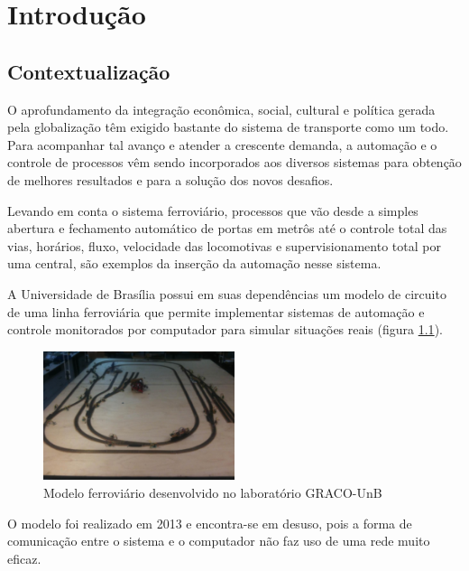 \chapter{Introdução}

\label{CapIntro}



\section{Contextualização}

O aprofundamento da integração econômica, social, cultural e política gerada pela globalização têm exigido bastante do sistema de transporte como um todo. Para acompanhar tal avanço e atender a crescente demanda, a automação e o controle de processos vêm sendo incorporados aos diversos sistemas para obtenção de melhores resultados e para a solução dos novos desafios.

Levando em conta o sistema ferroviário, processos que vão desde a simples abertura e fechamento automático de portas em metrôs até o controle total das vias, horários, fluxo, velocidade das locomotivas e supervisionamento total por uma central, são exemplos da inserção da automação nesse sistema.

A Universidade de Brasília possui em suas dependências um modelo de circuito de uma linha ferroviária que permite implementar sistemas de automação e controle monitorados por computador para simular situações reais (figura \ref{im::maquete}). 

\begin{figure}[H]
\centering
\includegraphics[width=0.5\textwidth]{imagens/maquete}
\caption{Modelo ferroviário desenvolvido no laboratório GRACO-UnB \cite{tgivan}}
\label{im::maquete}
\end{figure}  

O modelo foi realizado em 2013 e encontra-se em desuso, pois a forma de comunicação entre o sistema e o computador não faz uso de uma rede muito eficaz.

